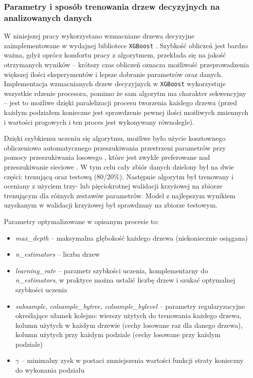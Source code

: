 \subsubsection*{Parametry i sposób trenowania drzew decyzyjnych na analizowanych danych}

W niniejszej pracy wykorzystano wzmacniane drzewa decyzyjne zaimplementowane w wydajnej bibliotece \texttt{XGBoost} \cite{chen16}. Szybkość obliczeń jest bardzo ważna, gdyż oprócz komfortu pracy z algorytmem, przekłada się
na jakość otrzymanych wyników -- krótszy czas obliczeń oznacza możliwość przeprowadzenia większej ilości eksperymentów i lepsze dobranie parametrów oraz danych.
Implementacja wzmacnianych drzew decyzyjnych w \texttt{XGBoost} wykorzystuje wszystkie rdzenie procesora, pomimo że sam algorytm ma charakter sekwencyjny -- jest to możliwe dzięki paralelizacji procesu tworzenia każdego drzewa (przed każdym podziałem konieczne jest sprawdzenie pewnej ilości możliwych zmiennych i wartości progowych i ten proces jest wykonywany równolegle).

Dzięki szybkiemu uczeniu się algorytmu, możliwe było użycie kosztownego obliczeniowo automatycznego przeszukiwania przestrzeni parametrów przy pomocy przeszukiwania losowego , które jest zwykle preferowane nad przeszukiwanie sieciowe \cite{bergstra12}. W tym celu cały zbiór danych dzielony był na dwie części: trenującą oraz testową (80/20\%). Następnie algorytm był trenowany i oceniany z użyciem trzy- lub pięciokrotnej walidacji krzyżowej  na zbiorze trenującym dla różnych zestawów parametrów. Model z najlepszym wynikiem uzyskanym w walidacji krzyżowej był sprawdzany na zbiorze testowym.

Parametry optymalizowane w opisanym procesie to:
\begin{itemize}
	\item \textit{max\_depth} -- maksymalna głębokość każdego drzewa (niekoniecznie osiągana)
	\item \textit{n\_estimators} -- liczba drzew
	\item \textit{learning\_rate} -- parametr szybkości uczenia, komplementarny do \textit{n\_estimators}, w praktyce można ustalić liczbę drzew i szukać optymalnej szybkości uczenia
	\item \textit{subsample, colsample\_bytree, colsample\_bylevel} -- parametry regularyzacyjne określające ułamek kolejno: wierszy użytych do trenowania każdego drzewa, kolumn użytych w każdym drzewie (cechy losowane raz dla danego drzewa), kolumn użytych przy każdym podziale (cechy losowane przy każdym podziale)
	 \item $\gamma$ -- minimalny zysk w postaci zmniejszenia wartości funkcji straty konieczny do wykonania podziału
\end{itemize}

